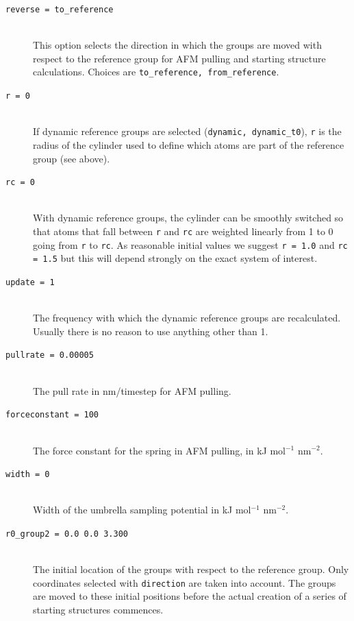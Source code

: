 \begin{description}
\item[\tt reverse                  = to\_reference]\mbox{}\\
This option selects the direction in which the groups are moved with
respect to the reference group for AFM pull\-ing and start\-ing structure
calcu\-lations. Choices are {\tt to\_reference, from\_reference}.

\item[\tt r                        = 0]\mbox{}\\
If dynamic reference groups are selected ({\tt dynamic, dynamic\_t0}),
{\tt r} is the radius of the cylinder used to define which atoms are
part of the reference group (see above).

\item[\tt rc                       = 0]\mbox{}\\
With dynamic reference groups, the cylinder can be smoothly switched
so that atoms that fall between {\tt r} and {\tt rc} are weighted
linearly from 1 to 0 going from {\tt r} to {\tt rc}. As reasonable
initial values we suggest {\tt r = 1.0} and {\tt rc = 1.5} but this
will depend strongly on the exact system of interest.

\item[\tt update                   = 1]\mbox{}\\
The frequency with which the dynamic reference groups are
recalculated. Usually there is no reason to use anything other than 1.

\item[\tt pullrate                 = 0.00005]\mbox{}\\
The pull rate in nm/timestep for AFM pulling.

\item[\tt forceconstant            = 100]\mbox{}\\
The force constant for the spring in AFM pulling, in kJ mol$^{-1}$
nm$^{-2}$.

\item[\tt width                    = 0]\mbox{}\\
Width of the umbrella sampling potential in kJ mol$^{-1}$ nm$^{-2}$. 

\item[\tt r0\_group2                = 0.0  0.0   3.300]\mbox{}\\
The initial location of the groups with respect to the reference
group. Only coordinates selected with {\tt direction} are taken into account.
The groups are moved to these initial positions before the
actual creation of a series of starting structures commences.


\end{description}

